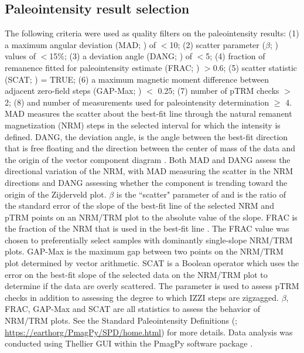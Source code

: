 \documentclass[9pt,twocolumn,twoside,lineno]{pnas-new}
\begin{document}
{\subsection*{Paleointensity result selection}
The following criteria were used as quality filters on the paleointensity results: (1) a maximum angular deviation (MAD;  \citealp{Kirschvink1980a}) of $<$10\textdegree; (2) scatter parameter ($\beta$;  \citealp{Coe1978a}) values of $<$15$\%$; (3) a deviation angle (DANG;  \citealp{Tauxe2004a}) of $<$5\textdegree; (4) fraction of remanence fitted for paleointensity estimate (FRAC;  \cite{Shaar2013a}) $>$0.6; (5) scatter statistic (SCAT;  \citealp{Shaar2013a}) = TRUE; (6) a maximum magnetic moment difference between adjacent zero-field steps (GAP-Max;  \citealp{Shaar2013a}) $<$ 0.25; (7) number of pTRM checks $>$ 2; (8) and number of measurements used for paleointensity determination $\geq$ 4. MAD measures the scatter about the best-fit line through the natural remanent magnetization (NRM) steps in the selected interval for which the intensity is defined. DANG, the deviation angle, is the angle between the best-fit direction that is free floating and the direction between the center of mass of the data and the origin of the vector component diagram \cite{Tauxe2004a}. Both MAD and DANG assess the directional variation of the NRM, with MAD measuring the scatter in the NRM directions and DANG assessing whether the component is trending toward the origin of the Zijderveld plot. $\beta$ is the ``scatter" parameter of  \cite{Coe1978a} and is the ratio of the standard error of the slope of the best-fit line of the selected NRM and pTRM points on an NRM/TRM plot to the absolute value of the slope. FRAC is the fraction of the NRM that is used in the best-fit line \cite{Shaar2013a}. The FRAC value was chosen to preferentially select samples with dominantly single-slope NRM/TRM plots. GAP-Max is the maximum gap between two points on the NRM/TRM plot determined by vector arithmetic. SCAT is a Boolean operator which uses the error on the best-fit slope of the selected data on the NRM/TRM plot to determine if the data are overly scattered. The parameter is used to assess pTRM checks in addition to assessing the degree to which IZZI steps are zigzagged. $\beta$, FRAC, GAP-Max and SCAT are all statistics to assess the behavior of NRM/TRM plots. See the Standard Paleointensity Definitions (\citealp{Paterson2014a}; \url{https://earthorg/PmagPy/SPD/home.html}) for more details. Data analysis was conducted using Thellier GUI \cite{Shaar2013a} within the PmagPy software package \cite{Tauxe2016a}.

}
\end{document}
